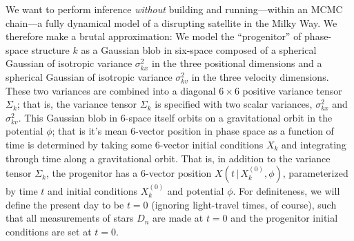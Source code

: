 \documentclass[letterpaper,12pt,preprint]{aastex}
\newcommand{\given}{\,|\,}
\begin{document}
We want to perform inference \emph{without} building and
running---within an MCMC chain---a fully dynamical model of a
disrupting satellite in the Milky Way.  We therefore make a brutal
approximation: We model the ``progenitor'' of phase-space structure
$k$ as a Gaussian blob in six-space composed of a spherical Gaussian
of isotropic variance $\sigma_{kx}^2$ in the three positional
dimensions and a spherical Gaussian of isotropic variance
$\sigma_{kv}^2$ in the three velocity dimensions.  These two variances
are combined into a diagonal $6\times 6$ positive variance tensor
$\Sigma_k$; that is, the variance tensor $\Sigma_k$ is specified with
two scalar variances, $\sigma_{kx}^2$ and $\sigma_{kv}^2$.  This
Gaussian blob in 6-space itself orbits on a gravitational orbit in the
potential $\phi$; that is it's mean 6-vector position in phase space
as a function of time is determined by taking some 6-vector initial
conditions $X_k$ and integrating through time along a gravitational
orbit.  That is, in addition to the variance tensor $\Sigma_k$, the
progenitor has a 6-vector position $X(t\given X_k^{(0)},\phi)$, parameterized by
time $t$ and initial conditions $X_k^{(0)}$ and potential $\phi$.  For definiteness, we will
define the present day to be $t=0$ (ignoring light-travel times, of
course), such that all measurements of stars $D_n$ are made at $t=0$
and the progenitor initial conditions are set at $t=0$.
\end{document}
